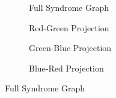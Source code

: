 \documentclass{article}
\begin{document}
\begin{figure}[ht]
    \centering
    \begin{subfigure}{0.2375\textwidth}
        \centering
        \resizebox{\textwidth}{!}{}
        \caption{Full Syndrome Graph}
    \end{subfigure}
    \hfill
    \begin{subfigure}{0.2375\textwidth}
        \centering
        \resizebox{\textwidth}{!}{}
        \caption{Red-Green Projection}
    \end{subfigure}
    \hfill
    \begin{subfigure}{0.2375\textwidth}
        \centering
        \resizebox{\textwidth}{!}{}
        \caption{Green-Blue Projection}
    \end{subfigure}
    \vspace{0.5cm}
    \begin{subfigure}{0.2375\textwidth}
        \centering
        \resizebox{\textwidth}{!}{}
        \caption{Blue-Red Projection}
    \end{subfigure}
    
    \vspace{0.5cm}
    \caption{Full Syndrome Graph}
\end{figure}
\end{document}

